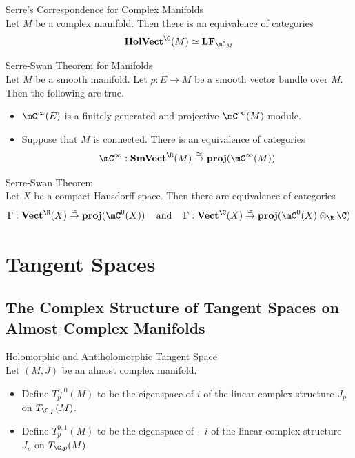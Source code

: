 \documentclass[a4paper]{article}
\begin{document}
\begin{thm}{Serre's Correspondence for Complex Manifolds}{}\\
Let $M$ be a complex manifold. Then there is an equivalence of categories $$\bold{HolVect}^\C(M)\simeq\bold{LF}_{\mO_M}$$
\end{thm}

\begin{thm}{Serre-Swan Theorem for Manifolds}{}\\
Let $M$ be a smooth manifold. Let $p:E\to M$ be a smooth vector bundle over $M$. Then the following are true. 
\begin{itemize}
\item $\mC^\infty(E)$ is a finitely generated and projective $\mC^\infty(M)$-module. 
\item Suppose that $M$ is connected. There is an equivalence of categories $$\mC^\infty:\bold{SmVect}^\R(M)\overset{\simeq}{\to}\bold{proj}(\mC^\infty(M))$$
\end{itemize}
\end{thm}

\begin{thm}{Serre-Swan Theorem}{}\\
Let $X$ be a compact Hausdorff space. Then there are equivalence of categories $$\Gamma:\bold{Vect}^\R(X)\overset{\simeq}{\to}\bold{proj}(\mC^0(X))\;\;\;\text{ and }\;\;\;\Gamma:\bold{Vect}^\C(X)\overset{\simeq}{\to}\bold{proj}(\mC^0(X)\otimes_\R\C)$$
\end{thm}

\pagebreak
\section{Tangent Spaces}
\subsection{The Complex Structure of Tangent Spaces on Almost Complex Manifolds}
\begin{defn}{Holomorphic and Antiholomorphic Tangent Space}{}\\
Let $(M,J)$ be an almost complex manifold. 
\begin{itemize}
\item Define $T_p^{1,0}(M)$ to be the eigenspace of $i$ of the linear complex structure $J_p$ on $T_{\C,p}(M)$. 
\item Define $T_p^{0,1}(M)$ to be the eigenspace of $-i$ of the linear complex structure $J_p$ on $T_{\C,p}(M)$. 
\end{itemize}
\end{defn}
\end{document}
